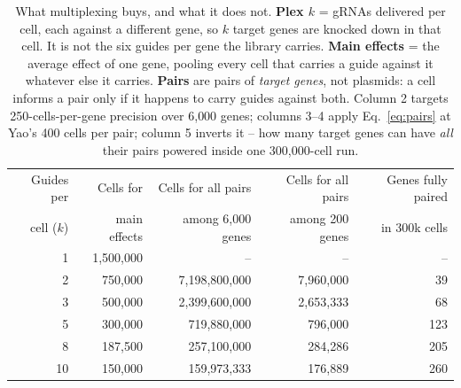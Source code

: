 \begin{table}[htbp]\centering
\footnotesize
\caption[]{What multiplexing buys, and what it does not. \textbf{Plex $k$} = gRNAs delivered per cell, each against a different gene, so $k$ target genes are knocked down in that cell. It is not the six guides per gene the library carries. \textbf{Main effects} = the average effect of one gene, pooling every cell that carries a guide against it whatever else it carries. \textbf{Pairs} are pairs of \emph{target genes}, not plasmids: a cell informs a pair only if it happens to carry guides against both. Column 2 targets 250-cells-per-gene precision over 6{,}000 genes; columns 3--4 apply Eq.~\ref{eq:pairs} at Yao's 400 cells per pair; column 5 inverts it -- how many target genes can have \emph{all} their pairs powered inside one 300{,}000-cell run.}\label{tab:multiplex}
\begin{tabular}{rrrrr}
\toprule
Guides per & Cells for & Cells for all pairs & Cells for all pairs & Genes fully paired \\
cell ($k$) & main effects & among 6{,}000 genes & among 200 genes & in 300k cells \\
\midrule
1 & 1{,}500{,}000 & -- & -- & -- \\
2 & 750{,}000 & 7{,}198{,}800{,}000 & 7{,}960{,}000 & 39 \\
3 & 500{,}000 & 2{,}399{,}600{,}000 & 2{,}653{,}333 & 68 \\
5 & 300{,}000 & 719{,}880{,}000 & 796{,}000 & 123 \\
8 & 187{,}500 & 257{,}100{,}000 & 284{,}286 & 205 \\
10 & 150{,}000 & 159{,}973{,}333 & 176{,}889 & 260 \\
\bottomrule
\end{tabular}
\end{table}
